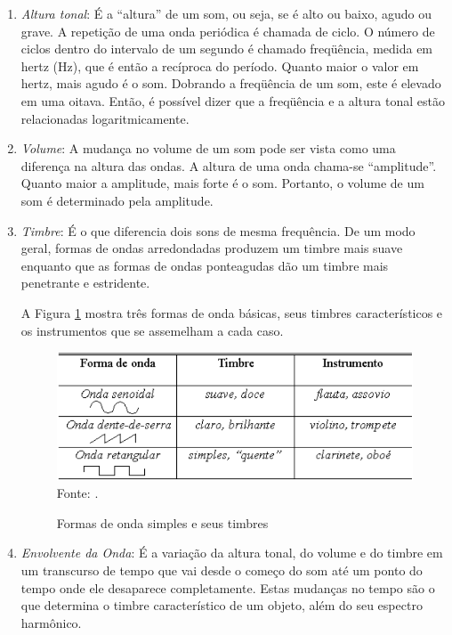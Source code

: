 \begin{enumerate}
\item \textit{Altura tonal}: É a “altura” de um som, ou seja, se é alto ou baixo, agudo ou grave. A repetição de uma onda periódica é chamada de ciclo. O número de ciclos dentro do intervalo de um segundo é chamado freqüência, medida em hertz (Hz), que é então a recíproca do período. Quanto maior o valor em hertz, mais agudo é o som. Dobrando a freqüência de um som, este é elevado em uma oitava. Então, é possível dizer que a freqüência e a altura tonal estão relacionadas logaritmicamente.

\item \textit{Volume}: A mudança no volume de um som pode ser vista como uma diferença na altura das ondas. A altura de uma onda chama-se “amplitude”. Quanto maior a amplitude, mais forte é o som. Portanto, o volume de um som é determinado pela amplitude.

\item \textit{Timbre}: É o que diferencia dois sons de mesma frequência. De um modo geral, formas de ondas arredondadas produzem um timbre mais suave enquanto que as formas de ondas ponteagudas dão um timbre mais penetrante e estridente.

A Figura \ref{fig:ondaTimbre} mostra três formas de onda básicas, seus timbres característicos e os instrumentos que se assemelham a cada caso.

\begin{figure}[!htb]
   \centering
   \caption{Formas de onda simples e seus timbres}\label{fig:ondaTimbre} 
   \includegraphics[scale=0.50]{figuras/ondaTimbre.png}
   \\Fonte: \cite{miletto2004}.
\end{figure}

\item \textit{Envolvente da Onda}: É a variação da altura tonal, do volume e do timbre em um transcurso de tempo que vai desde o começo do som até um ponto do tempo onde ele desaparece completamente. Estas mudanças no tempo são o que determina o timbre característico de um objeto, além do seu espectro harmônico.
\end{enumerate}

